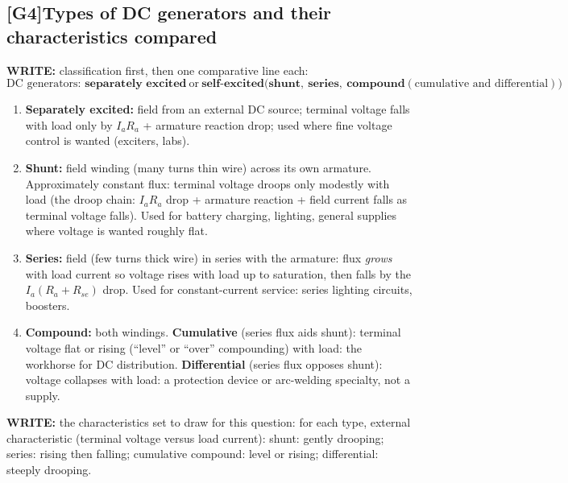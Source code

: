 \documentclass[11pt]{article}
\newcommand{\q}[2]{\subsection*{\color{copper}#1\quad\color{iron}#2}}
\newcommand{\w}[1]{\textbf{\color{copper}WRITE:} #1}
\begin{document}
\q{[G4]}{Types of DC generators and their characteristics compared}
\w{classification first, then one comparative line each:}
\[
\text{DC generators: } \textbf{separately excited}\ \text{or}\ \textbf{self-excited} \Big( \textbf{shunt},\ \textbf{series},\ \textbf{compound} (\text{cumulative and differential}) \Big)
\]
\begin{enumerate}[label=\arabic*.]
\item \textbf{Separately excited:} field from an external DC source; terminal voltage falls with load only by $I_a R_a$ + armature reaction drop; used where fine voltage control is wanted (exciters, labs).
\item \textbf{Shunt:} field winding (many turns thin wire) across its own armature. Approximately constant flux: terminal voltage droops only modestly with load (the droop chain: $I_a R_a$ drop + armature reaction + field current falls as terminal voltage falls). Used for battery charging, lighting, general supplies where voltage is wanted roughly flat.
\item \textbf{Series:} field (few turns thick wire) in series with the armature: flux \emph{grows} with load current so voltage rises with load up to saturation, then falls by the $I_a (R_a + R_{se})$ drop. Used for constant-current service: series lighting circuits, boosters.
\item \textbf{Compound:} both windings. \textbf{Cumulative} (series flux aids shunt): terminal voltage flat or rising (``level'' or ``over'' compounding) with load: the workhorse for DC distribution. \textbf{Differential} (series flux opposes shunt): voltage collapses with load: a protection device or arc-welding specialty, not a supply.
\end{enumerate}
\w{the characteristics set to draw for this question:} for each type, external characteristic (terminal voltage versus load current): shunt: gently drooping; series: rising then falling; cumulative compound: level or rising; differential: steeply drooping.
\end{document}
